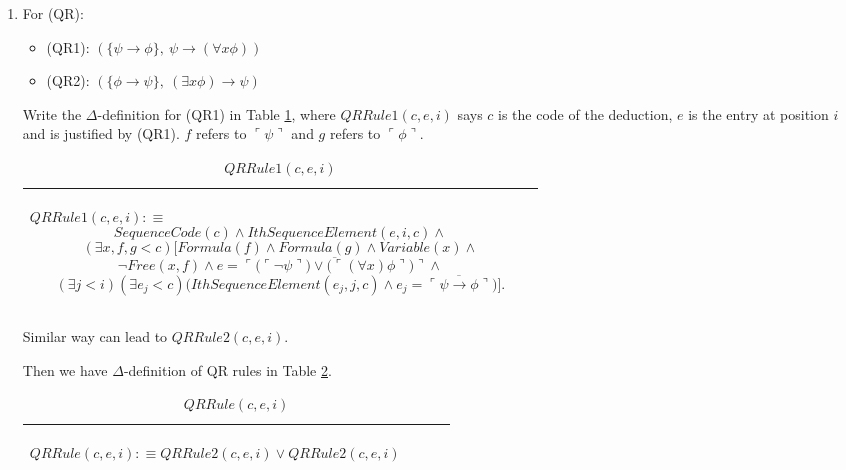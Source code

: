 \documentclass[11pt,letterpaper]{book}
\theoremstyle{definition}
\begin{document}
\begin{enumerate}
\item{For (QR):}
\begin{itemize}
\item{(QR1): $ ( \{ \psi \rightarrow \phi \},\ \psi \rightarrow (\forall x \phi ) ) $}
\item{(QR2):  $( \{ \phi \rightarrow \psi \},\ (\exists x \phi) \rightarrow \psi ) $}
\end{itemize}

Write the $\Delta$-definition for (QR1) in Table \ref{box:QR_rule1}, where $QRRule1(c, e, i)$ says $c$ is the code of the deduction, $e$ is the entry at position $i$ and is justified by (QR1). $f$ refers to $\ulcorner \psi \urcorner$ and $g$ refers to $\ulcorner \phi \urcorner$.


\begin{table}[ht!]
\caption{$QRRule1(c, e, i)$}
\label{box:QR_rule1}
\begin{tabular}{|p{0.9\linewidth}|}
\hline
\rule{0pt}{3ex}
\begin{center}
$QRRule1(c, e, i) : \equiv $
$$ SequenceCode(c) \land IthSequenceElement(e, i, c) \land $$
$$ (\exists x, f, g < c) \bigg[ Formula(f) \land Formula(g) \land Variable(x) \land$$ 
$$ \lnot Free(x, f)  \land e = \overline{\ulcorner \big( \ulcorner \lnot  \psi \urcorner \big) \lor \big( \ulcorner (\forall x ) \phi \urcorner \big) \urcorner} \land $$ 
$$ (\exists j < i ) (\exists e_j < c) \big( IthSequenceElement(e_j, j, c) \land e_j = \overline{\ulcorner \psi \rightarrow \phi \urcorner}  \big) \bigg]  . $$
\end{center}\\
\hline
\end{tabular}
\end{table}

Similar way can lead to $QRRule2(c, e, i)$.

Then we have $\Delta$-definition of QR rules in Table \ref{box:QR_rules}.


\begin{table}[ht!]
\caption{$QRRule(c, e, i)$}
\label{box:QR_rules}
\begin{tabular}{|p{0.9\linewidth}|}
\hline
\rule{0pt}{3ex}
\begin{center}
$QRRule(c, e, i) : \equiv  QRRule2(c, e, i) \lor QRRule2(c, e, i) $
\end{center}\\
\hline
\end{tabular}
\end{table}


\end{enumerate}
\end{document}
